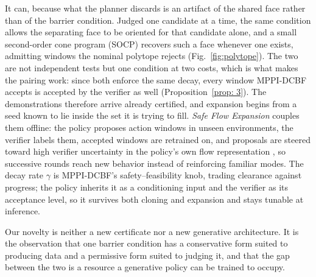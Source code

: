 \documentclass[letterpaper, 10 pt, conference]{ieeeconf}
\begin{document}
{\color{blue}
It can, because what the planner discards is an artifact of the shared face rather than of the barrier condition. Judged one candidate at a time, the same condition allows the separating face to be oriented for that candidate alone, and a small second-order cone program (SOCP) recovers such a face whenever one exists, admitting windows the nominal polytope rejects (Fig.~\ref{fig:polytope}). The two are not independent tests but one condition at two costs, which is what makes the pairing work: since both enforce the same decay, every window MPPI-DCBF accepts is accepted by the verifier as well (Proposition~\ref{prop: 3}). The demonstrations therefore arrive already certified, and expansion begins from a seed known to lie inside the set it is trying to fill. \textit{Safe Flow Expansion} couples them offline: the policy proposes action windows in unseen environments, the verifier labels them, accepted windows are retrained on, and proposals are steered toward high verifier uncertainty in the policy's own flow representation \cite{de2026active}, so successive rounds reach new behavior instead of reinforcing familiar modes. The decay rate $\gamma$ is MPPI-DCBF's safety--feasibility knob, trading clearance against progress; the policy inherits it as a conditioning input and the verifier as its acceptance level, so it survives both cloning and expansion and stays tunable at inference.
}

{\color{blue}
Our novelty is neither a new certificate nor a new generative architecture. It is the observation that one barrier condition has a conservative form suited to producing data and a permissive form suited to judging it, and that the gap between the two is a resource a generative policy can be trained to occupy.
}

%
\end{document}
